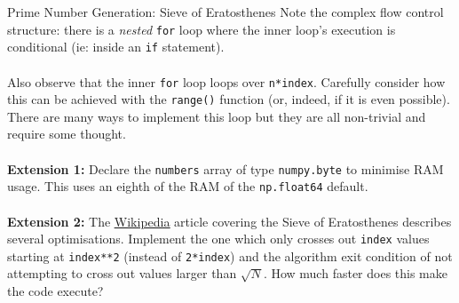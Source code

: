 \documentclass{lab}
\begin{document}
\begin{task}{Prime Number Generation: Sieve of Eratosthenes}{}
Note the complex flow control structure: there is a \textit{nested} \texttt{for} loop where the inner loop's execution is conditional (ie: inside an \texttt{if} statement).
\\~\\
Also observe that the inner \texttt{for} loop loops over \texttt{n*index}. Carefully consider how this can be achieved with the \texttt{range()} function (or, indeed, if it is even possible). There are many ways to implement this loop but they are all non-trivial and require some thought.
\\~\\
\textbf{Extension 1:} Declare the \texttt{numbers} array of type \texttt{numpy.byte} to minimise RAM usage. This uses an eighth of the RAM of the \texttt{np.float64} default.
\\~\\
\textbf{Extension 2:} The \underline{\href{https://en.wikipedia.org/wiki/Sieve_of_Eratosthenes}{Wikipedia}} article covering the Sieve of Eratosthenes describes several optimisations. Implement the one which only crosses out \texttt{index} values starting at \texttt{index**2} (instead of \texttt{2*index}) and the algorithm exit condition of not attempting to cross out values larger than $\sqrt{N}$. How much faster does this make the code execute?
\end{task}
\end{document}
